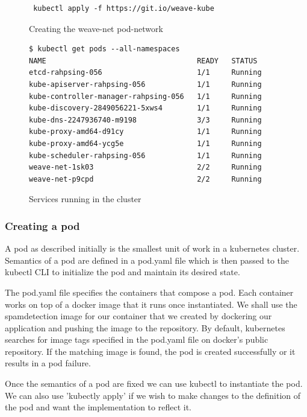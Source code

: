\documentclass[9pt,twocolumn,twoside]{../../styles/osajnl}
\begin{document}
{\begin{figure}[H]
\begin{verbatim}
 kubectl apply -f https://git.io/weave-kube
\end{verbatim}
\caption{Creating the weave-net pod-network}
\label{Creating the weave-net pod-network}
\end{figure}

\begin{figure}[H]
\begin{verbatim}
$ kubectl get pods --all-namespaces
NAME                                   READY   STATUS       
etcd-rahpsing-056                      1/1     Running          
kube-apiserver-rahpsing-056            1/1     Running           
kube-controller-manager-rahpsing-056   1/1     Running           
kube-discovery-2849056221-5xws4        1/1     Running         
kube-dns-2247936740-m9198              3/3     Running           
kube-proxy-amd64-d91cy                 1/1     Running           
kube-proxy-amd64-ycg5e                 1/1     Running           
kube-scheduler-rahpsing-056            1/1     Running           
weave-net-1sk03                        2/2     Running           
weave-net-p9cpd                        2/2     Running           
\end{verbatim}
\caption{Services running in the cluster}
\label{Services running in the cluster}
\end{figure}

\subsubsection{Creating a pod}
A pod as described initially is the smallest unit of work in a
kubernetes cluster. Semantics of a pod are defined in a pod.yaml file
which is then passed to the kubectl CLI to initialize the pod and
maintain its desired state.

\noindent
The pod.yaml file specifies the containers that compose a pod. Each
container works on top of a docker image that it runs once
instantiated. We shall use the spamdetection image for our container
that we created by dockering our application and pushing the image to
the repository. By default, kubernetes searches for image tags
specified in the pod.yaml file on docker's public repository. If the
matching image is found, the pod is created successfully or it results
in a pod failure.

\noindent
Once the semantics of a pod are fixed we can use kubectl to
instantiate the pod. We can also use 'kubectly apply' if we wish to
make changes to the definition of the pod and want the implementation
to reflect it.


}
\end{document}
